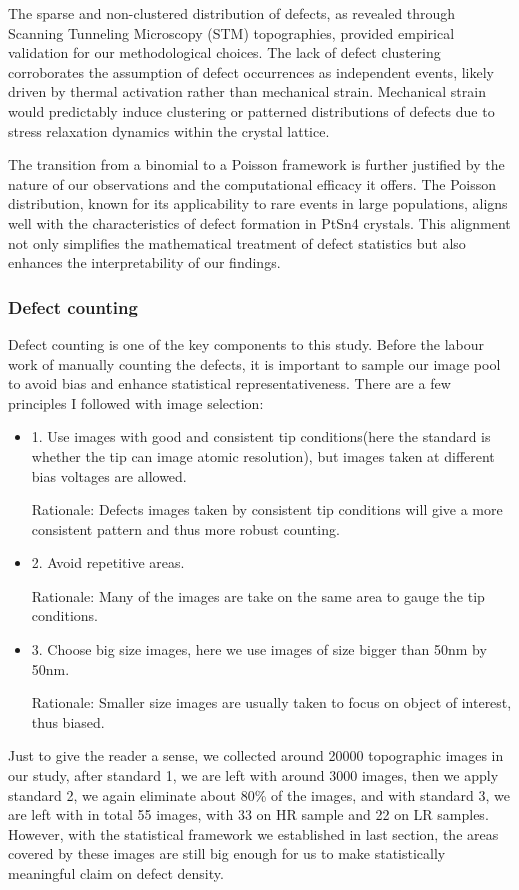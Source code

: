 \par The sparse and non-clustered distribution of defects, as revealed through Scanning Tunneling Microscopy (STM) topographies, provided empirical validation for our methodological choices. The lack of defect clustering corroborates the assumption of defect occurrences as independent events, likely driven by thermal activation rather than mechanical strain. Mechanical strain would predictably induce clustering or patterned distributions of defects due to stress relaxation dynamics within the crystal lattice.
\par The transition from a binomial to a Poisson framework is further justified by the nature of our observations and the computational efficacy it offers. The Poisson distribution, known for its applicability to rare events in large populations, aligns well with the characteristics of defect formation in PtSn4 crystals. This alignment not only simplifies the mathematical treatment of defect statistics but also enhances the interpretability of our findings.

\subsubsection{Defect counting}
Defect counting is one of the key components to this study. Before the labour work of manually counting the defects, it is important to sample our image pool to avoid bias and enhance statistical representativeness. There are a few principles I followed with image selection: 
\begin{itemize}
	\item 1. Use images with good and consistent tip conditions(here the standard is whether the tip can image atomic resolution), but images taken at different bias voltages are allowed. 
	\par Rationale: Defects images taken by consistent tip conditions will give a more consistent pattern and thus more robust counting.	
	\item 2. Avoid repetitive areas. 
	\par Rationale: Many of the images are take on the same area to gauge the tip conditions.
	\item 3. Choose big size images, here we use images of size bigger than 50nm by 50nm.
	\par Rationale: Smaller size images are usually taken to focus on object of interest, thus biased.  
\end{itemize}  
Just to give the reader a sense, we collected around 20000 topographic images in our study, after standard 1, we are left with around 3000 images, then we apply standard 2, we again eliminate about 80\% of the images, and with standard 3, we are left with in total 55 images, with 33 on HR sample and 22 on LR samples. However, with the statistical framework we established in last section, the areas covered by these images are still big enough for us to make statistically meaningful claim on defect density.

